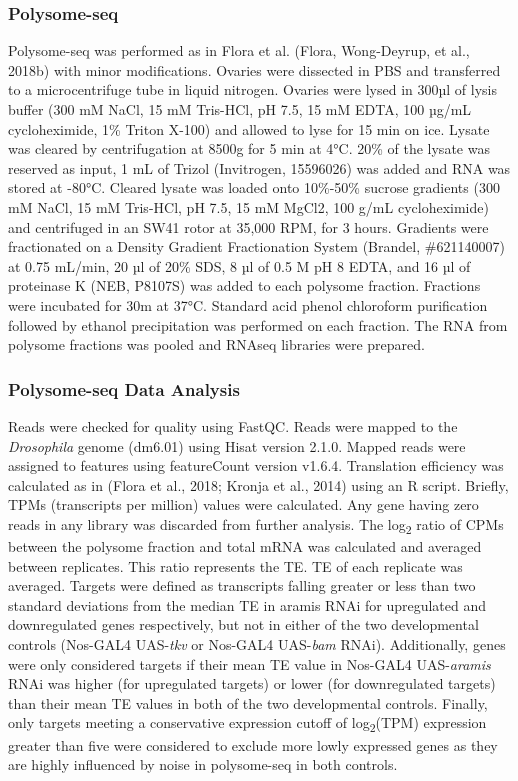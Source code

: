 \documentclass[12pt,oneside]{reedthesis}
\begin{document}
\hypertarget{polysome-seq}{%
\subsubsection{Polysome-seq}\label{polysome-seq}}

Polysome-seq was performed as in Flora et al. (Flora, Wong-Deyrup, et al., 2018b) with minor modifications. Ovaries were dissected in PBS and transferred to a microcentrifuge tube in liquid nitrogen. Ovaries were lysed in 300µl of lysis buffer (300 mM NaCl, 15 mM Tris-HCl, pH 7.5, 15 mM EDTA, 100 µg/mL cycloheximide, 1\% Triton X-100) and allowed to lyse for 15 min on ice. Lysate was cleared by centrifugation at 8500g for 5 min at 4°C. 20\% of the lysate was reserved as input, 1 mL of Trizol (Invitrogen, 15596026) was added and RNA was stored at -80°C. Cleared lysate was loaded onto 10\%-50\% sucrose gradients (300 mM NaCl, 15 mM Tris-HCl, pH 7.5, 15 mM MgCl2, 100 g/mL cycloheximide) and centrifuged in an SW41 rotor at 35,000 RPM, for 3 hours. Gradients were fractionated on a Density Gradient Fractionation System (Brandel, \#621140007) at 0.75 mL/min, 20 µl of 20\% SDS, 8 µl of 0.5 M pH 8 EDTA, and 16 µl of proteinase K (NEB, P8107S) was added to each polysome fraction. Fractions were incubated for 30m at 37°C. Standard acid phenol chloroform purification followed by ethanol precipitation was performed on each fraction. The RNA from polysome fractions was pooled and RNAseq libraries were prepared.

\hypertarget{polysome-seq-data-analysis}{%
\subsubsection{Polysome-seq Data Analysis}\label{polysome-seq-data-analysis}}

Reads were checked for quality using FastQC. Reads were mapped to the \emph{Drosophila} genome (dm6.01) using Hisat version 2.1.0. Mapped reads were assigned to features using featureCount version v1.6.4. Translation efficiency was calculated as in (Flora et al., 2018; Kronja et al., 2014) using an R script. Briefly, TPMs (transcripts per million) values were calculated. Any gene having zero reads in any library was discarded from further analysis. The log\textsubscript{2} ratio of CPMs between the polysome fraction and total mRNA was calculated and averaged between replicates. This ratio represents the TE. TE of each replicate was averaged. Targets were defined as transcripts falling greater or less than two standard deviations from the median TE in aramis RNAi for upregulated and downregulated genes respectively, but not in either of the two developmental controls (Nos-GAL4 UAS-\emph{tkv} or Nos-GAL4 UAS-\emph{bam} RNAi). Additionally, genes were only considered targets if their mean TE value in Nos-GAL4 UAS-\emph{aramis} RNAi was higher (for upregulated targets) or lower (for downregulated targets) than their mean TE values in both of the two developmental controls. Finally, only targets meeting a conservative expression cutoff of log\textsubscript{2}(TPM) expression greater than five were considered to exclude more lowly expressed genes as they are highly influenced by noise in polysome-seq in both controls.
\end{document}
